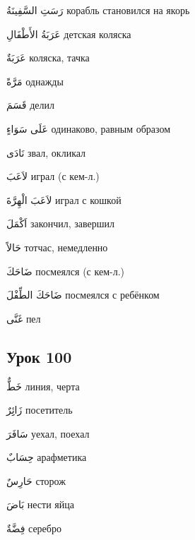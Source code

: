 \documentclass[a5paper]{article}
\newcommand\textstyleDropCaps[1]{#1}
\newcommand\textstyleCaptioncharacters[1]{#1}
\begin{document}
\textstyleCaptioncharacters{رَسَتِ السَّفِينَةُ }\textstyleDropCaps{корабль становился на якорь‎}

\textstyleCaptioncharacters{عَرَبَةُ الأَطْفَالِ }\textstyleDropCaps{детская коляска‎}

\textstyleCaptioncharacters{عَرَبَةٌ }\textstyleDropCaps{коляска, тачка‎}

\textstyleCaptioncharacters{مَرَّةً }\textstyleDropCaps{однажды‎}

\textstyleCaptioncharacters{قَسَمَ }\textstyleDropCaps{делил‎}

\textstyleCaptioncharacters{عَلَى سَوَاءٍ }\textstyleDropCaps{одинаково, равным образом‎}

\textstyleCaptioncharacters{نَادَى }\textstyleDropCaps{звал, окликал‎}

\textstyleCaptioncharacters{لاَعَبَ }\textstyleDropCaps{играл (с кем-л.)‎}

\textstyleCaptioncharacters{لاَعَبَ الْهِرَّةَ }\textstyleDropCaps{играл с кош­кой‎}

\textstyleCaptioncharacters{اَكْمَلَ }\textstyleDropCaps{закончил, завершил‎}

\textstyleCaptioncharacters{حَالاً }\textstyleDropCaps{тотчас, немедленно‎}

\textstyleCaptioncharacters{ضَاحَكَ }\textstyleDropCaps{посмеялся (с кем-л.)‎}

\textstyleCaptioncharacters{ضَاحَكَ الطِّفْلَ }\textstyleDropCaps{посмеял­ся с ребёнком‎}

\textstyleCaptioncharacters{غَنَّى }\textstyleDropCaps{пел‎}

\subsection[Урок 100‎]{\textstyleDropCaps{Урок 100‎}}
\textstyleCaptioncharacters{خَطٌّ }\textstyleDropCaps{линия, черта‎}

\textstyleCaptioncharacters{زَائِِرٌ }\textstyleDropCaps{посетитель‎}

\textstyleCaptioncharacters{سَافَرَ }\textstyleDropCaps{уехал, поехал‎}

\textstyleCaptioncharacters{حِسَابٌ }\textstyleDropCaps{арафметика‎}

\textstyleCaptioncharacters{حَارِسٌ }\textstyleDropCaps{сторож‎}

\textstyleCaptioncharacters{بَاضَ }\textstyleDropCaps{нести яйца‎}

\textstyleCaptioncharacters{فِضَّةٌ }\textstyleDropCaps{серебро‎}
\end{document}
